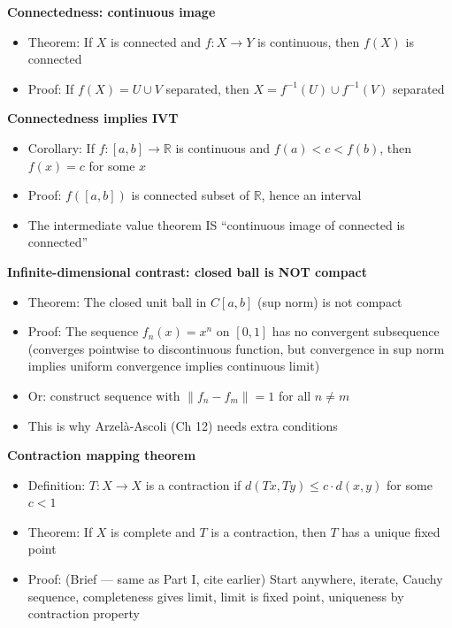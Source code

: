 \documentclass[
  10pt,
  letterpaper,
]{scrbook}
\providecommand{\tightlist}{%
  \setlength{\itemsep}{0pt}\setlength{\parskip}{0pt}}
\begin{document}
\textbf{Connectedness: continuous image}

\begin{itemize}
\tightlist
\item
  Theorem: If \(X\) is connected and \(f: X \to Y\) is continuous, then
  \(f(X)\) is connected
\item
  Proof: If \(f(X) = U \cup V\) separated, then
  \(X = f^{-1}(U) \cup f^{-1}(V)\) separated
\end{itemize}

\textbf{Connectedness implies IVT}

\begin{itemize}
\tightlist
\item
  Corollary: If \(f: [a,b] \to \mathbb{R}\) is continuous and
  \(f(a) < c < f(b)\), then \(f(x) = c\) for some \(x\)
\item
  Proof: \(f([a,b])\) is connected subset of \(\mathbb{R}\), hence an
  interval
\item
  The intermediate value theorem IS ``continuous image of connected is
  connected''
\end{itemize}

\textbf{Infinite-dimensional contrast: closed ball is NOT compact}

\begin{itemize}
\tightlist
\item
  Theorem: The closed unit ball in \(C[a,b]\) (sup norm) is not compact
\item
  Proof: The sequence \(f_n(x) = x^n\) on \([0,1]\) has no convergent
  subsequence (converges pointwise to discontinuous function, but
  convergence in sup norm implies uniform convergence implies continuous
  limit)
\item
  Or: construct sequence with \(\|f_n - f_m\| = 1\) for all \(n \neq m\)
\item
  This is why Arzelà-Ascoli (Ch 12) needs extra conditions
\end{itemize}

\textbf{Contraction mapping theorem}

\begin{itemize}
\tightlist
\item
  Definition: \(T: X \to X\) is a contraction if
  \(d(Tx, Ty) \leq c \cdot d(x,y)\) for some \(c < 1\)
\item
  Theorem: If \(X\) is complete and \(T\) is a contraction, then \(T\)
  has a unique fixed point
\item
  Proof: (Brief --- same as Part I, cite earlier) Start anywhere,
  iterate, Cauchy sequence, completeness gives limit, limit is fixed
  point, uniqueness by contraction property
\end{itemize}
\end{document}
